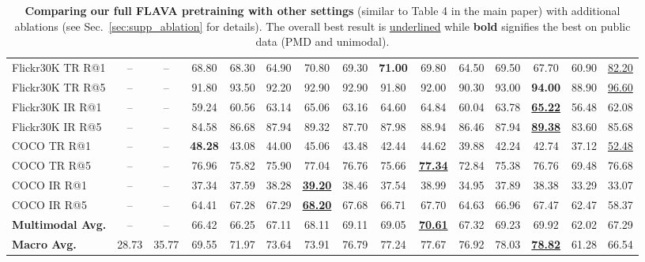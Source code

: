\documentclass[10pt,twocolumn,letterpaper]{article}
\begin{document}
\begin{table*}[ht]
\begin{tabular}{lccccccccccccc|c}
Flickr30K TR R@1 & -- & -- & 68.80 & 68.30 & 64.90 & 70.80 & 69.30 & \textbf{71.00} & 69.80 & 64.50 & 69.50 & 67.70 & 60.90 & \underline{82.20} \\
Flickr30K TR R@5 & -- & -- & 91.80 & 93.50 & 92.20 & 92.90 & 92.90 & 91.80 & 92.00 & 90.30 & 93.00 & \textbf{94.00} & 88.90 & \underline{96.60} \\
Flickr30K IR R@1 & -- & -- & 59.24 & 60.56 & 63.14 & 65.06 & 63.16 & 64.60 & 64.84 & 60.04 & 63.78 & \textbf{\underline{65.22}} & 56.48 & 62.08 \\
Flickr30K IR R@5 & -- & -- & 84.58 & 86.68 & 87.94 & 89.32 & 87.70 & 87.98 & 88.94 & 86.46 & 87.94 & \textbf{\underline{89.38}} & 83.60 & 85.68 \\
COCO TR R@1 & -- & -- & \textbf{48.28} & 43.08 & 44.00 & 45.06 & 43.48 & 42.44 & 44.62 & 39.88 & 42.24 & 42.74 & 37.12 & \underline{52.48} \\
COCO TR R@5 & -- & -- & 76.96 & 75.82 & 75.90 & 77.04 & 76.76 & 75.66 & \textbf{\underline{77.34}} & 72.84 & 75.38 & 76.76 & 69.48 & 76.68 \\
COCO IR R@1 & -- & -- & 37.34 & 37.59 & 38.28 & \textbf{\underline{39.20}} & 38.46 & 37.54 & 38.99 & 34.95 & 37.89 & 38.38 & 33.29 & 33.07 \\
COCO IR R@5 & -- & -- & 64.41 & 67.28 & 67.29 & \textbf{\underline{68.20}} & 67.68 & 66.71 & 67.70 & 64.63 & 66.96 & 67.47 & 62.47 & 58.37 \\
\midrule
\textbf{Multimodal Avg.} & -- & -- & 66.42 & 66.25 & 67.11 & 68.11 & 69.11 & 69.05 & \textbf{\underline{70.61}} & 67.32 & 69.23 & 69.92 & 62.02 & 67.29 \\
\midrule
\textbf{Macro Avg.} & 28.73 & 35.77 & 69.55 & 71.97 & 73.64 & 73.91 & 76.79 & 77.24 & 77.67 & 76.92 & 78.03 & \textbf{\underline{78.82}} & 61.28 & 66.54 \\
\bottomrule
\end{tabular}
\caption{\textbf{Comparing our full FLAVA pretraining with other settings} (similar to Table 4 in the main paper) with additional ablations (see Sec.~\ref{sec:supp_ablation} for details). The overall best result is \underline{underlined} while \textbf{bold} signifies the best on public data (PMD and unimodal).}
\label{tab:ablations_appendix}
\end{table*}
\end{document}
